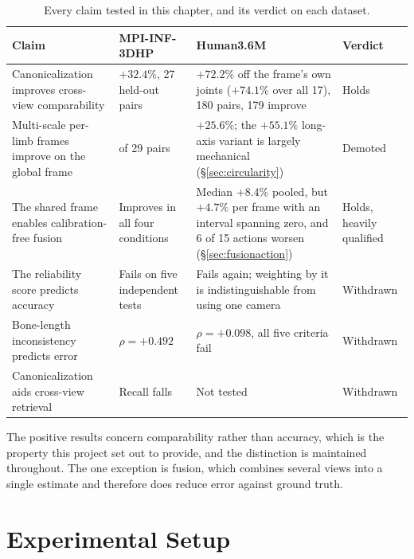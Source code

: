 \documentclass[12pt,a4paper]{report}
\begin{document}
\begin{table}[htbp]
\centering
\caption{Every claim tested in this chapter, and its verdict on each dataset.}
\label{tab:summary}
{\fontsize{9}{11}\selectfont
\setlength{\tabcolsep}{4pt}
\begin{tabular}{>{\raggedright\arraybackslash}p{4.8cm}>{\raggedright\arraybackslash}p{3.4cm}>{\raggedright\arraybackslash}p{3.4cm}>{\raggedright\arraybackslash}p{2.1cm}}
\hline
\textbf{Claim} & \textbf{MPI-INF-3DHP} & \textbf{Human3.6M} & \textbf{Verdict} \\
\hline
Canonicalization improves cross-view comparability
 & $+32.4\%$, 27 held-out pairs
 & $+72.2\%$ off the frame's own joints ($+74.1\%$ over all 17), 180 pairs, 179 improve
 & Holds \\
Multi-scale per-limb frames improve on the global frame
 & 29 of 29 pairs
 & $+25.6\%$; the $+55.1\%$ long-axis variant is largely mechanical (\S\ref{sec:circularity})
 & Demoted \\
The shared frame enables calibration-free fusion
 & Improves in all four conditions
 & Median $+8.4\%$ pooled, but $+4.7\%$ per frame with an interval spanning zero, and 6 of 15 actions worsen (\S\ref{sec:fusionaction})
 & Holds, heavily qualified \\
The reliability score predicts accuracy
 & Fails on five independent tests
 & Fails again; weighting by it is indistinguishable from using one camera
 & Withdrawn \\
Bone-length inconsistency predicts error
 & $\rho = +0.492$
 & $\rho = +0.098$, all five criteria fail
 & Withdrawn \\
Canonicalization aids cross-view retrieval
 & Recall falls
 & Not tested
 & Withdrawn \\
\hline
\end{tabular}}
\end{table}

The positive results concern comparability rather than accuracy, which is the property this project set out to provide, and the distinction is maintained throughout. The one exception is fusion, which combines several views into a single estimate and therefore does reduce error against ground truth.

\section{Experimental Setup}
\end{document}
